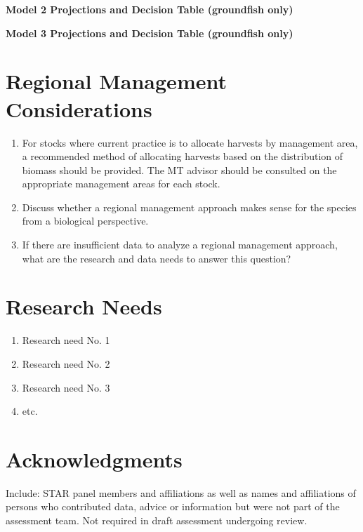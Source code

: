 \documentclass[12pt,]{article}
\providecommand{\tightlist}{%
  \setlength{\itemsep}{0pt}\setlength{\parskip}{0pt}}
\begin{document}
\textbf{Model 2 Projections and Decision Table (groundfish only)}

\textbf{Model 3 Projections and Decision Table (groundfish only)}

\section{Regional Management
Considerations}\label{regional-management-considerations}

\begin{enumerate}
\def\labelenumi{\arabic{enumi}.}
\tightlist
\item
  For stocks where current practice is to allocate harvests by
  management area, a recommended method of allocating harvests based on
  the distribution of biomass should be provided. The MT advisor should
  be consulted on the appropriate management areas for each stock.
\item
  Discuss whether a regional management approach makes sense for the
  species from a biological perspective.
\item
  If there are insufficient data to analyze a regional management
  approach, what are the research and data needs to answer this
  question?
\end{enumerate}

\section{Research Needs}\label{research-needs}

\begin{enumerate}

\item Research need No. 1

\item Research need No. 2

\item Research need No. 3

\item etc.

\end{enumerate}

\section{Acknowledgments}\label{acknowledgments}

Include: STAR panel members and affiliations as well as names and
affiliations of persons who contributed data, advice or information but
were not part of the assessment team. Not required in draft assessment
undergoing review.
\end{document}
